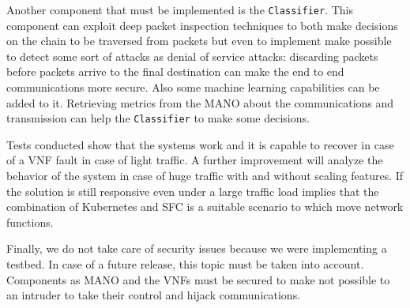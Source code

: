 Another component that must be implemented is the \texttt{Classifier}. This
component can exploit deep packet inspection techniques to both make decisions
on the chain to be traversed from packets but even to implement make possible to
detect some sort of attacks as denial of service attacks: discarding packets
before packets arrive to the final destination can make the end to end
communications more secure. Also some machine learning capabilities can be added
to it. Retrieving metrics from the MANO about the communications and
transmission can help the \texttt{Classifier} to make some decisions.

Tests conducted show that the systems work and it is capable to recover in case
of a VNF fault in case of light traffic. A further improvement will analyze the
behavior of the system in case of huge traffic with and without scaling
features. If the solution is still responsive even under a large traffic load
implies that the combination of Kubernetes and SFC is a suitable scenario to
which move network functions.

Finally, we do not take care of security issues because we were implementing a
testbed. In case of a future release, this topic must be taken into account.
Components as MANO and the VNFs must be secured to make not possible to an
intruder to take their control and hijack communications. 